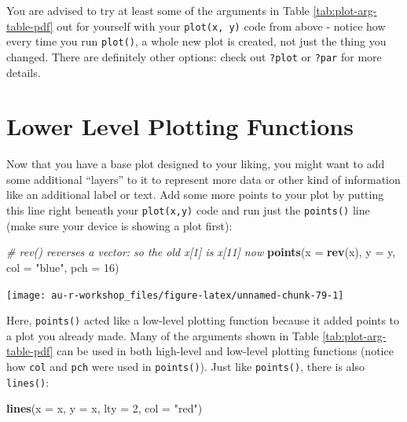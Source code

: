 \documentclass[]{book}
\newenvironment{Shaded}{\begin{snugshade}}{\end{snugshade}}
\newcommand{\CommentTok}[1]{\textcolor[rgb]{0.56,0.35,0.01}{\textit{#1}}}
\newcommand{\DataTypeTok}[1]{\textcolor[rgb]{0.13,0.29,0.53}{#1}}
\newcommand{\DecValTok}[1]{\textcolor[rgb]{0.00,0.00,0.81}{#1}}
\newcommand{\KeywordTok}[1]{\textcolor[rgb]{0.13,0.29,0.53}{\textbf{#1}}}
\newcommand{\NormalTok}[1]{#1}
\newcommand{\StringTok}[1]{\textcolor[rgb]{0.31,0.60,0.02}{#1}}
\begin{document}
You are advised to try at least some of the arguments in Table \ref{tab:plot-arg-table-pdf} out for yourself with your \texttt{plot(x,\ y)} code from above - notice how every time you run \texttt{plot()}, a whole new plot is created, not just the thing you changed. There are definitely other options: check out \texttt{?plot} or \texttt{?par} for more details.

\hypertarget{lower-level-plotting-functions}{%
\section{Lower Level Plotting Functions}\label{lower-level-plotting-functions}}

Now that you have a base plot designed to your liking, you might want to add some additional ``layers'' to it to represent more data or other kind of information like an additional label or text. Add some more points to your plot by putting this line right beneath your \texttt{plot(x,y)} code and run just the \texttt{points()} line (make sure your device is showing a plot first):

\begin{Shaded}
\begin{Highlighting}[]
\CommentTok{# rev() reverses a vector: so the old x[1] is x[11] now}
\KeywordTok{points}\NormalTok{(}\DataTypeTok{x =} \KeywordTok{rev}\NormalTok{(x), }\DataTypeTok{y =}\NormalTok{ y, }\DataTypeTok{col =} \StringTok{"blue"}\NormalTok{, }\DataTypeTok{pch =} \DecValTok{16}\NormalTok{)}
\end{Highlighting}
\end{Shaded}

\begin{center}\texttt{[image: au-r-workshop\_files/figure-latex/unnamed-chunk-79-1]} \end{center}

Here, \texttt{points()} acted like a low-level plotting function because it added points to a plot you already made. Many of the arguments shown in Table \ref{tab:plot-arg-table-pdf} can be used in both high-level and low-level plotting functions (notice how \texttt{col} and \texttt{pch} were used in \texttt{points()}). Just like \texttt{points()}, there is also \texttt{lines()}:

\begin{Shaded}
\begin{Highlighting}[]
\KeywordTok{lines}\NormalTok{(}\DataTypeTok{x =}\NormalTok{ x, }\DataTypeTok{y =}\NormalTok{ x, }\DataTypeTok{lty =} \DecValTok{2}\NormalTok{, }\DataTypeTok{col =} \StringTok{"red"}\NormalTok{)}
\end{Highlighting}
\end{Shaded}
\end{document}
